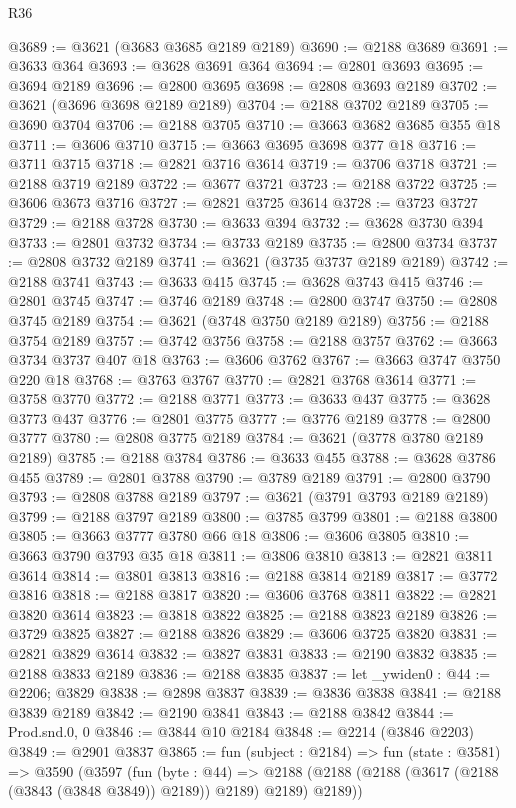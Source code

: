 \begin{lexlean}{R36}
\begin{coremodule}
@3689 := @3621 (@3683 @3685 @2189 @2189)
@3690 := @2188 @3689
@3691 := @3633 @364
@3693 := @3628 @3691 @364
@3694 := @2801 @3693
@3695 := @3694 @2189
@3696 := @2800 @3695
@3698 := @2808 @3693 @2189
@3702 := @3621 (@3696 @3698 @2189 @2189)
@3704 := @2188 @3702 @2189
@3705 := @3690 @3704
@3706 := @2188 @3705
@3710 := @3663 @3682 @3685 @355 @18
@3711 := @3606 @3710
@3715 := @3663 @3695 @3698 @377 @18
@3716 := @3711 @3715
@3718 := @2821 @3716 @3614
@3719 := @3706 @3718
@3721 := @2188 @3719 @2189
@3722 := @3677 @3721
@3723 := @2188 @3722
@3725 := @3606 @3673 @3716
@3727 := @2821 @3725 @3614
@3728 := @3723 @3727
@3729 := @2188 @3728
@3730 := @3633 @394
@3732 := @3628 @3730 @394
@3733 := @2801 @3732
@3734 := @3733 @2189
@3735 := @2800 @3734
@3737 := @2808 @3732 @2189
@3741 := @3621 (@3735 @3737 @2189 @2189)
@3742 := @2188 @3741
@3743 := @3633 @415
@3745 := @3628 @3743 @415
@3746 := @2801 @3745
@3747 := @3746 @2189
@3748 := @2800 @3747
@3750 := @2808 @3745 @2189
@3754 := @3621 (@3748 @3750 @2189 @2189)
@3756 := @2188 @3754 @2189
@3757 := @3742 @3756
@3758 := @2188 @3757
@3762 := @3663 @3734 @3737 @407 @18
@3763 := @3606 @3762
@3767 := @3663 @3747 @3750 @220 @18
@3768 := @3763 @3767
@3770 := @2821 @3768 @3614
@3771 := @3758 @3770
@3772 := @2188 @3771
@3773 := @3633 @437
@3775 := @3628 @3773 @437
@3776 := @2801 @3775
@3777 := @3776 @2189
@3778 := @2800 @3777
@3780 := @2808 @3775 @2189
@3784 := @3621 (@3778 @3780 @2189 @2189)
@3785 := @2188 @3784
@3786 := @3633 @455
@3788 := @3628 @3786 @455
@3789 := @2801 @3788
@3790 := @3789 @2189
@3791 := @2800 @3790
@3793 := @2808 @3788 @2189
@3797 := @3621 (@3791 @3793 @2189 @2189)
@3799 := @2188 @3797 @2189
@3800 := @3785 @3799
@3801 := @2188 @3800
@3805 := @3663 @3777 @3780 @66 @18
@3806 := @3606 @3805
@3810 := @3663 @3790 @3793 @35 @18
@3811 := @3806 @3810
@3813 := @2821 @3811 @3614
@3814 := @3801 @3813
@3816 := @2188 @3814 @2189
@3817 := @3772 @3816
@3818 := @2188 @3817
@3820 := @3606 @3768 @3811
@3822 := @2821 @3820 @3614
@3823 := @3818 @3822
@3825 := @2188 @3823 @2189
@3826 := @3729 @3825
@3827 := @2188 @3826
@3829 := @3606 @3725 @3820
@3831 := @2821 @3829 @3614
@3832 := @3827 @3831
@3833 := @2190 @3832
@3835 := @2188 @3833 @2189
@3836 := @2188 @3835
@3837 := let _ywiden0 : @44 := @2206; @3829
@3838 := @2898 @3837
@3839 := @3836 @3838
@3841 := @2188 @3839 @2189
@3842 := @2190 @3841
@3843 := @2188 @3842
@3844 := Prod.snd.{0, 0}
@3846 := @3844 @10 @2184
@3848 := @2214 (@3846 @2203)
@3849 := @2901 @3837
@3865 := fun (subject : @2184) =>
  fun (state : @3581) =>
  @3590
    (@3597
      (fun (byte : @44) =>
      @2188 (@2188 (@2188 (@3617 (@2188 (@3843 (@3848 @3849)) @2189)) @2189) @2189) @2189))

\end{coremodule}
\end{lexlean}
